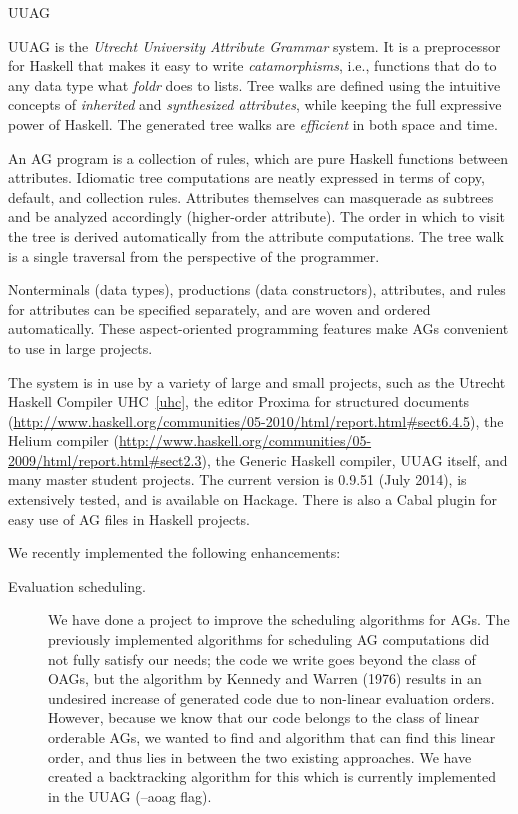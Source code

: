 \begin{hcarentry}{UUAG}
\label{uuag}
\makeheader

UUAG is the \emph{Utrecht University Attribute Grammar} system. It is a preprocessor for Haskell
that makes it easy to write \emph{catamorphisms}, i.e., functions that do to any data type what
\emph{foldr} does to lists. Tree walks are defined using the intuitive concepts of
\emph{inherited} and \emph{synthesized attributes}, while keeping the full expressive power
of Haskell. The generated tree walks are \emph{efficient} in both space and time.

An AG program is a collection of rules, which are pure Haskell functions between attributes.
Idiomatic tree computations are neatly expressed in terms of copy, default, and collection rules.
Attributes themselves can masquerade as subtrees and be analyzed accordingly (higher-order attribute). The order in which to visit the tree is derived automatically from the attribute computations. The tree walk is a single traversal from the perspective of the programmer.

Nonterminals (data types), productions (data constructors), attributes, and rules for attributes can be specified separately, and are woven and ordered automatically. These aspect-oriented programming features make AGs convenient to use in large projects.

The system is in use by a variety of large and small projects, such as the Utrecht Haskell Compiler UHC~\cref{uhc}, the editor Proxima for structured documents (\url{http://www.haskell.org/communities/05-2010/html/report.html#sect6.4.5}), the Helium compiler (\url{http://www.haskell.org/communities/05-2009/html/report.html#sect2.3}), the Generic Haskell compiler, UUAG itself, and many master student projects.
The current version is 0.9.51 (July 2014), is extensively tested, and is available on Hackage. There is also a Cabal plugin for easy use of AG files in Haskell projects.

We recently implemented the following enhancements:
\begin{description}
\item[Evaluation scheduling.]
  We have done a project to improve the scheduling algorithms for AGs. The previously implemented algorithms for scheduling AG computations did not fully satisfy our needs; the code we write goes beyond the class of OAGs, but the algorithm by Kennedy and Warren (1976) results in an undesired increase of generated code due to non-linear evaluation orders. However, because we know that our code belongs to the class of linear orderable AGs, we wanted to find and algorithm that can find this linear order, and thus lies in between the two existing approaches. We have created a backtracking algorithm for this which is currently implemented in the UUAG (--aoag flag).


\end{description}
\end{hcarentry}
